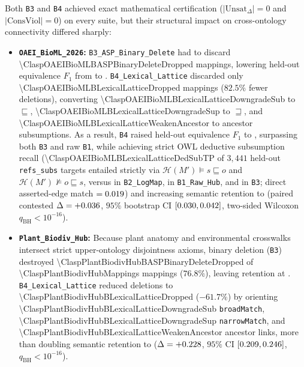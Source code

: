 \documentclass[10pt]{article}
\theoremstyle{accentdef}
\begin{document}
Both \texttt{B3} and \texttt{B4} achieved exact mathematical certification ($|\mathrm{Unsat}_{\Delta}| = 0$ and $|\mathrm{ConsViol}| = 0$) on every suite, but their structural impact on cross-ontology connectivity differed sharply:
\begin{itemize}
  \item \textbf{\texttt{OAEI\_BioML\_2026}:} \texttt{B3\_ASP\_Binary\_Delete} had to discard \num{\ClaspOAEIBioMLBASPBinaryDeleteDropped} mappings, lowering held-out equivalence $F_1$ from \ClaspOAEIBioMLBRawHubEquivFone{} to \ClaspOAEIBioMLBASPBinaryDeleteEquivFone{}. \texttt{B4\_Lexical\_Lattice} discarded only \num{\ClaspOAEIBioMLBLexicalLatticeDropped} mappings ($82.5\%$ fewer deletions), converting \num{\ClaspOAEIBioMLBLexicalLatticeDowngradeSub} to $\sqsubseteq$, \num{\ClaspOAEIBioMLBLexicalLatticeDowngradeSup} to $\sqsupseteq$, and \num{\ClaspOAEIBioMLBLexicalLatticeWeakenAncestor} to ancestor subsumptions. As a result, \texttt{B4} raised held-out equivalence $F_1$ to \ClaspOAEIBioMLBLexicalLatticeEquivFone{}, surpassing both \texttt{B3} and raw \texttt{B1}, while achieving \ClaspOAEIBioMLBLexicalLatticeDedSubRecall{} strict OWL deductive subsumption recall (\num{\ClaspOAEIBioMLBLexicalLatticeDedSubTP} of $3{,}441$ held-out \texttt{refs\_subs} targets entailed strictly via $\mathcal{H}(M') \models s \sqsubseteq o$ and $\mathcal{H}(M') \not\models o \sqsubseteq s$, versus \ClaspOAEIBioMLBLogMapRepairDedSubRecall{} in \texttt{B2\_LogMap}, \ClaspOAEIBioMLBRawHubDedSubRecall{} in \texttt{B1\_Raw\_Hub}, and \ClaspOAEIBioMLBASPBinaryDeleteDedSubRecall{} in \texttt{B3}; direct asserted-edge match $= 0.019{}$) and increasing semantic retention to \ClaspOAEIBioMLBLexicalLatticeRetention{} (paired contested $\Delta = +0.036{}$, $95\%$ bootstrap CI $[0.030{}, 0.042{}]$, two-sided Wilcoxon $q_{\mathrm{BH}} < 10^{-16}$).
  \item \textbf{\texttt{Plant\_Biodiv\_Hub}:} Because plant anatomy and environmental crosswalks intersect strict upper-ontology disjointness axioms, binary deletion (\texttt{B3}) destroyed \num{\ClaspPlantBiodivHubBASPBinaryDeleteDropped} of \num{\ClaspPlantBiodivHubMappings} mappings ($76.8\%$), leaving retention at \ClaspPlantBiodivHubBASPBinaryDeleteRetention{}. \texttt{B4\_Lexical\_Lattice} reduced deletions to \num{\ClaspPlantBiodivHubBLexicalLatticeDropped} ($-61.7\%$) by orienting \num{\ClaspPlantBiodivHubBLexicalLatticeDowngradeSub} \texttt{broadMatch}, \num{\ClaspPlantBiodivHubBLexicalLatticeDowngradeSup} \texttt{narrowMatch}, and \num{\ClaspPlantBiodivHubBLexicalLatticeWeakenAncestor} ancestor links, more than doubling semantic retention to \ClaspPlantBiodivHubBLexicalLatticeRetention{} ($\Delta = +0.228{}$, $95\%$ CI $[0.209{}, 0.246{}]$, $q_{\mathrm{BH}} < 10^{-16}$).

\end{itemize}
\end{document}
